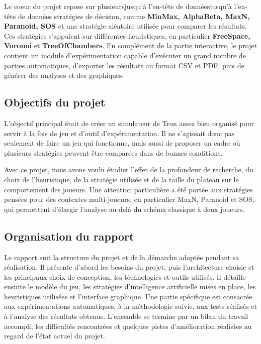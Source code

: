 \documentclass[11pt,a4paper]{article}
\begin{document}
Le coeur du projet repose sur plusieursjusqu'à l'en-tête de donnéesjusqu'à l'en-tête de données stratégies de décision, comme \textbf{MinMax, AlphaBeta, MaxN, Paranoid, SOS} et une stratégie aléatoire utilisée pour comparer les résultats. Ces stratégies s'appuient sur différentes heuristiques, en particulier \textbf{FreeSpace, Voronoi} et \textbf{TreeOfChambers}. En complément de la partie interactive, le projet contient un module d'expérimentation capable d'exécuter un grand nombre de parties automatiques, d'exporter les résultats au format CSV et PDF, puis de générer des analyses et des graphiques.

\subsection{Objectifs du projet}

L'objectif principal était de créer un simulateur de Tron assez bien organisé pour servir à la fois de jeu et d'outil d'expérimentation. Il ne s'agissait donc pas seulement de faire un jeu qui fonctionne, mais aussi de proposer un cadre où plusieurs stratégies peuvent être comparées dans de bonnes conditions. 

Avec ce projet, nous avons voulu étudier l'effet de la profondeur de recherche, du choix de l'heuristique, de la stratégie utilisée et de la taille du plateau sur le comportement des joueurs. Une attention particulière a été portée aux stratégies pensées pour des contextes multi-joueurs, en particulier MaxN, Paranoid et SOS, qui permettent d'élargir l'analyse au-delà du schéma classique à deux joueurs.

\subsection{Organisation du rapport}

Le rapport suit la structure du projet et de la démarche adoptée pendant sa réalisation. Il présente d'abord les besoins du projet, puis l'architecture choisie et les principaux choix de conception, les téchnologies et outils utilisés. Il détaille ensuite le modèle du jeu, les stratégies d'intelligence artificielle mises en place, les heuristiques utilisées et l'interface graphique. Une partie spécifique est consacrée aux expérimentations automatiques, à la méthodologie suivie, aux tests réalisés et à l'analyse des résultats obtenus. L'ensemble se termine par un bilan du travail accompli, les difficultés rencontrées et quelques pistes d'amélioration réalistes au regard de l'état actuel du projet.
\end{document}
